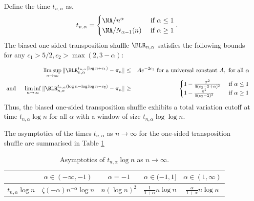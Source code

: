 \documentclass[11pt]{report}
\begin{document}
\begin{thm}
	\label{chpt5:thm:biasedbounds}
	Define the time $t_{n,\alpha}$ as, 
	\[t_{n,\alpha}= \begin{cases}
	\NA/n^{\alpha} & \textnormal{ if } \alpha \leq 1 \\
	\NA/N_{\alpha-1}(n) & \textnormal{ if } \alpha \geq 1 
	\end{cases}. \]
	The biased one-sided transposition shuffle $\BLR_{n,\alpha}$ satisfies the following bounds for any $c_{1} >5/2, c_{2} >\max(2, 3-\alpha)$:
	
	\begin{eqnarray*}
		\limsup_{n\rightarrow \infty}\, \lVert 
		\BLR_{n,\alpha}^{t_{n,\alpha}\left(\log n + c_{1}\right)} -\pi_{n} 
		\rVert & 
		\leq & 	Ae^{-2c_{1}} 
		\textnormal{ 	for a universal constant } A, \textnormal{ for all } 
		\alpha \\
		\text{ and } \quad 
		\liminf_{n\to\infty}\, \lVert 
		\BLR_{n,\alpha}^{t_{n,\alpha}\left(\log n - \log \log n - 
			c_{2}\right)} 
		-\pi_{n} \rVert & 
		\geq 
		& \begin{cases}
			1 - \frac{\pi^{2}}{6(c_{2}-3+\alpha)^{2}} & \textnormal{ if } \alpha 
			\leq 1 \\
			1 - \frac{\pi^{2}}{6(c_{2}-2)^{2}} & \textnormal{ if } \alpha \geq 1 
		\end{cases} 
	\end{eqnarray*}
	Thus, the biased one-sided transposition shuffle  exhibits a total variation cutoff at time $t_{n,\alpha}\log n$ for all $\alpha$ with a window of size $t_{n,\alpha}\log \log n$. 
\end{thm}

The asymptotics of the times $t_{n,\alpha}$ as $n\to\infty$ for the one-sided transposition shuffle are summarised in Table \ref{chpt5:table:biasedtime}








\begin{table}[H]
	\begin{tabular}{c|c|c|c|c}
		& $\alpha \in (-\infty,-1)$ & $\alpha =-1$ & $\alpha \in (-1,1]$ & $\alpha \in (1,\infty)$
		\\\hline
		$t_{n,\alpha}\log n$ & $\zeta(-\alpha) n^{-\alpha} \log n$ & $n(\log n)^{2}$ & $ \frac{1}{1+\alpha} n \log n$ & $\frac{\alpha}{1+\alpha} n \log n$ 
	\end{tabular}
	
	\caption[Asymptotics of $t_{n,\alpha} \log n$ as $n\to\infty$]{Asymptotics of $t_{n,\alpha} \log n$ as $n\to\infty$.}
	\label{chpt5:table:biasedtime}
\end{table}
\end{document}
